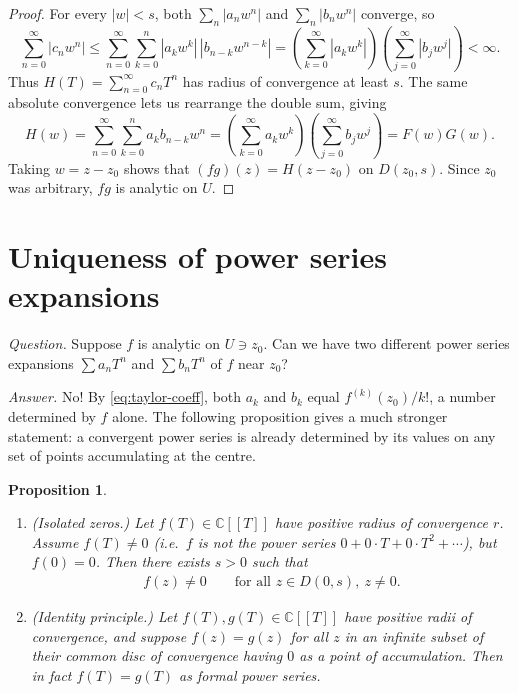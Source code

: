 \documentclass[11pt]{article}
\theoremstyle{plain}
\newtheorem{proposition}[theorem]{Proposition}
\theoremstyle{definition}
\theoremstyle{remark}
\numberwithin{equation}{section}
\newcommand{\be}{\begin{eqnarray}}
\newcommand{\ee}{\end{eqnarray}}
\newcommand{\C}{\mathbb{C}}
\newcommand{\CT}{\C[[T]]}
\begin{document}
\begin{proof}
For every $|w|<s$, both $\sum_n|a_nw^n|$ and $\sum_n|b_nw^n|$ converge, so
\[
 \sum_{n=0}^{\infty}|c_nw^n|
 \leq \sum_{n=0}^{\infty}\sum_{k=0}^n
       |a_kw^k|\,|b_{n-k}w^{n-k}|
 =\left(\sum_{k=0}^{\infty}|a_kw^k|\right)
  \left(\sum_{j=0}^{\infty}|b_jw^j|\right)<\infty.
\]
Thus $H(T)=\sum_{n=0}^{\infty}c_nT^n$ has radius of convergence at least $s$.
The same absolute convergence lets us rearrange the double sum, giving
\[
 H(w)=\sum_{n=0}^{\infty}\sum_{k=0}^n a_kb_{n-k}w^n
 =\left(\sum_{k=0}^{\infty}a_kw^k\right)
  \left(\sum_{j=0}^{\infty}b_jw^j\right)=F(w)G(w).
\]
Taking $w=z-z_0$ shows that $(fg)(z)=H(z-z_0)$ on $D(z_0,s)$.
Since $z_0$ was arbitrary, $fg$ is analytic on $U$.



\end{proof}
\section{Uniqueness of power series expansions}
\emph{Question.} Suppose $f$ is analytic on $U\ni z_0$. Can we have two
different power series expansions $\sum a_nT^n$ and $\sum b_nT^n$ of $f$
near $z_0$?

\emph{Answer.} No! By \eqref{eq:taylor-coeff}, both $a_k$ and $b_k$ equal
$f^{(k)}(z_0)/k!$, a number determined by $f$ alone. The following
proposition gives a much stronger statement: a convergent power series is
already determined by its values on any set of points accumulating at the
centre.

\begin{proposition}
\label{prop:identity}
\leavevmode
\begin{enumerate}[label=\textcircled{\scriptsize\arabic*}]
  \item \emph{(Isolated zeros.)} Let $f(T)\in\CT$ have positive radius of
  convergence $r$. Assume $f(T)\neq0$ (i.e.\ $f$ is not the power series
  $0+0\cdot T+0\cdot T^2+\cdots$), but $f(0)=0$. Then there exists $s>0$ such
  that
  \be
   f(z)\neq0\qquad\text{for all }z\in D(0,s),\ z\neq0.
  \ee
  \item \emph{(Identity principle.)} Let $f(T),g(T)\in\CT$ have positive
  radii of convergence, and suppose $f(z)=g(z)$ for all $z$ in an infinite
  subset of their common disc of convergence having $0$ as a point of
  accumulation. Then in fact $f(T)=g(T)$ as formal power series.
\end{enumerate}
\end{proposition}
\end{document}
